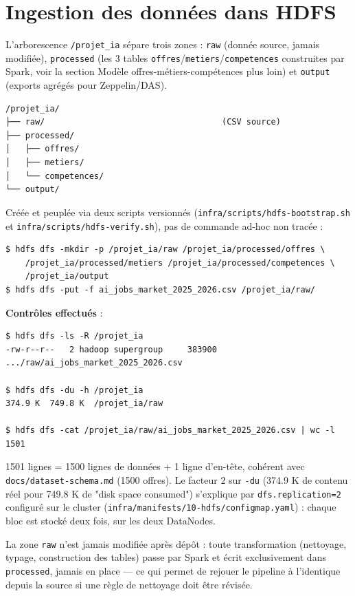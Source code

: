 \section{Ingestion des données dans HDFS}

L'arborescence \texttt{/projet\_ia} sépare trois zones : \texttt{raw}
(donnée source, jamais modifiée), \texttt{processed} (les 3 tables
\texttt{offres}/\texttt{metiers}/\texttt{competences} construites par
Spark, voir la section Modèle offres-métiers-compétences plus loin) et
\texttt{output}
(exports agrégés pour Zeppelin/DAS).

\begin{lstlisting}
/projet_ia/
├── raw/                                    (CSV source)
├── processed/
│   ├── offres/
│   ├── metiers/
│   └── competences/
└── output/
\end{lstlisting}

Créée et peuplée via deux scripts versionnés
(\texttt{infra/scripts/hdfs-bootstrap.sh} et
\texttt{infra/scripts/hdfs-verify.sh}), pas de commande ad-hoc non
tracée :

\begin{lstlisting}
$ hdfs dfs -mkdir -p /projet_ia/raw /projet_ia/processed/offres \
    /projet_ia/processed/metiers /projet_ia/processed/competences \
    /projet_ia/output
$ hdfs dfs -put -f ai_jobs_market_2025_2026.csv /projet_ia/raw/
\end{lstlisting}

\textbf{Contrôles effectués} :

\begin{lstlisting}
$ hdfs dfs -ls -R /projet_ia
-rw-r--r--   2 hadoop supergroup     383900  .../raw/ai_jobs_market_2025_2026.csv

$ hdfs dfs -du -h /projet_ia
374.9 K  749.8 K  /projet_ia/raw

$ hdfs dfs -cat /projet_ia/raw/ai_jobs_market_2025_2026.csv | wc -l
1501
\end{lstlisting}

1501 lignes = 1500 lignes de données + 1 ligne d'en-tête, cohérent avec
\texttt{docs/dataset-schema.md} (1500 offres). Le facteur 2 sur
\texttt{-du} (374.9 K de contenu réel pour 749.8 K de "disk space
consumed") s'explique par \texttt{dfs.replication=2} configuré sur le
cluster (\texttt{infra/manifests/10-hdfs/configmap.yaml}) : chaque bloc
est stocké deux fois, sur les deux DataNodes.

La zone \texttt{raw} n'est jamais modifiée après dépôt : toute
transformation (nettoyage, typage, construction des tables) passe par
Spark et écrit exclusivement dans \texttt{processed}, jamais en place —
ce qui permet de rejouer le pipeline à l'identique depuis la source si
une règle de nettoyage doit être révisée.
